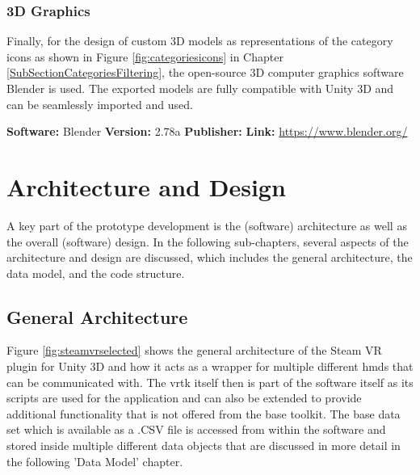\subsubsection{3D Graphics}

Finally, for the design of custom 3D models as representations of the category icons as shown in Figure \ref{fig:categoriesicons} in Chapter \ref{SubSectionCategoriesFiltering}, the  open-source 3D computer graphics software Blender is used. The exported models are fully compatible with Unity 3D and can be seamlessly imported and used.

\textbf{Software:} Blender \newline
\textbf{Version:} 2.78a \newline
\textbf{Publisher:} \cite{Blender2016} \newline
\textbf{Link:} \url{https://www.blender.org/}



\section{Architecture and Design}

A key part of the prototype development is the (software) architecture as well as the overall (software) design. In the following sub-chapters, several aspects of the architecture and design are discussed, which includes the general architecture, the data model, and the code structure.


\subsection{General Architecture}

Figure \ref{fig:steamvrselected} shows the general architecture of the Steam VR plugin for Unity 3D and how it acts as a wrapper for multiple different \glspl{hmd} that can be communicated with. The \gls{vrtk} itself then is part of the software itself as its scripts are used for the application and can also be extended to provide additional functionality that is not offered from the base toolkit. The base data set which is available as a .CSV file is accessed from within the software and stored inside multiple different data objects that are discussed in more detail in the following 'Data Model' chapter.

